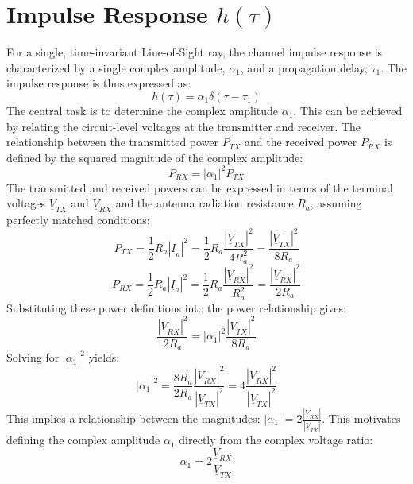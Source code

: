 \section{Impulse Response $h(\tau)$}
For a single, time-invariant Line-of-Sight ray, the channel impulse response is characterized by a single complex amplitude, $\alpha_1$, and a propagation delay, $\tau_1$. The impulse response is thus expressed as:
\begin{equation}
	h(\tau) = \alpha_1 \delta(\tau - \tau_1)
\end{equation}
The central task is to determine the complex amplitude $\alpha_1$. This can be achieved by relating the circuit-level voltages at the transmitter and receiver. The relationship between the transmitted power $P_{TX}$ and the received power $P_{RX}$ is defined by the squared magnitude of the complex amplitude:
\begin{equation}
	P_{RX} = |\alpha_1|^2 P_{TX}
\end{equation}
The transmitted and received powers can be expressed in terms of the terminal voltages $\underline{V}_{TX}$ and $\underline{V}_{RX}$ and the antenna radiation resistance $R_a$, assuming perfectly matched conditions:
\begin{equation}
	P_{TX} = \frac{1}{2} R_a |\underline{I}_a|^2 = \frac{1}{2} R_a \frac{|\underline{V}_{TX}|^2}{4R_a^2} = \frac{|\underline{V}_{TX}|^2}{8R_a} 
\end{equation}
\begin{equation}
	P_{RX} = \frac{1}{2} R_a |\underline{I}_a|^2 = \frac{1}{2} R_a \frac{|\underline{V}_{RX}|^2}{R_a^2}= \frac{|\underline{V}_{RX}|^2}{2R_a}
\end{equation}
Substituting these power definitions into the power relationship gives:
\begin{equation}
	\frac{|\underline{V}_{RX}|^2}{2R_a} = |\alpha_1|^2 \frac{|\underline{V}_{TX}|^2}{8R_a}
\end{equation}
Solving for $|\alpha_1|^2$ yields:
\begin{equation}
	|\alpha_1|^2 = \frac{8R_a}{2R_a} \frac{|\underline{V}_{RX}|^2}{|\underline{V}_{TX}|^2} = 4 \frac{|\underline{V}_{RX}|^2}{|\underline{V}_{TX}|^2}
\end{equation}
This implies a relationship between the magnitudes: $|\alpha_1| = 2 \frac{|\underline{V}_{RX}|}{|\underline{V}_{TX}|}$. This motivates defining the complex amplitude $\alpha_1$ directly from the complex voltage ratio:
\begin{equation}
	\alpha_1 = 2 \frac{\underline{V}_{RX}}{\underline{V}_{TX}}
	\label{eq:alpha_from_voltages}
\end{equation}
